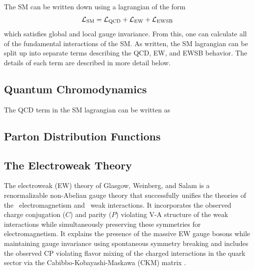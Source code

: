 The SM can be written down using a lagrangian of the form
\begin{equation}
\mathcal{L}_{\textrm{SM}} = \mathcal{L}_{\textrm{QCD}} + \mathcal{L}_{\textrm{EW}} + \mathcal{L}_{\textrm{EWSB}}
\label{eq:lagrangian_sm}
\end{equation}
which satisfies global and local gauge invariance.
From this, one can calculate all of the fundamental interactions of the SM.
As written, the SM lagrangian can be split up into separate terms describing the
QCD, EW, and EWSB behavior. 
The details of each term are described in more detail below.


\subsection{Quantum Chromodynamics}
The QCD term in the SM lagrangian can be written as
\subsection{Parton Distribution Functions}
\subsection{The Electroweak Theory}
\label{sec:theory_ew}
The electroweak (EW) 
theory of Glasgow, Weinberg, and 
Salam \cite{glashow:1961tr,Salam:1968rm,weinberg:1967tq}
is a renormalizable \cite{hooft1971renormalization,Hooft1971167}
non-Abelian gauge theory 
that successfully unifies the theories 
of the \uone~electromagnetism and \sutwo~weak interactions.
It incorporates the observed 
charge conjugation ($C$) 
and parity ($P$) violating V-A structure of the weak interactions
\cite{PhysRev.105.1413,Garwin:1957hc,PhysRev.106.1290}
while simultaneously preserving these symmetries for electromagnetism.
It explains the presence of the massive EW gauge bosons 
while maintaining gauge invariance
using spontaneous symmetry breaking
and includes the observed CP violating 
\cite{PhysRevLett.13.138} 
flavor mixing of the 
charged interactions in the quark sector via 
the Cabibbo-Kobayashi-Maskawa  (CKM)
matrix \cite{Cabibbo:1963yz,Kobayashi:1973fv}.

